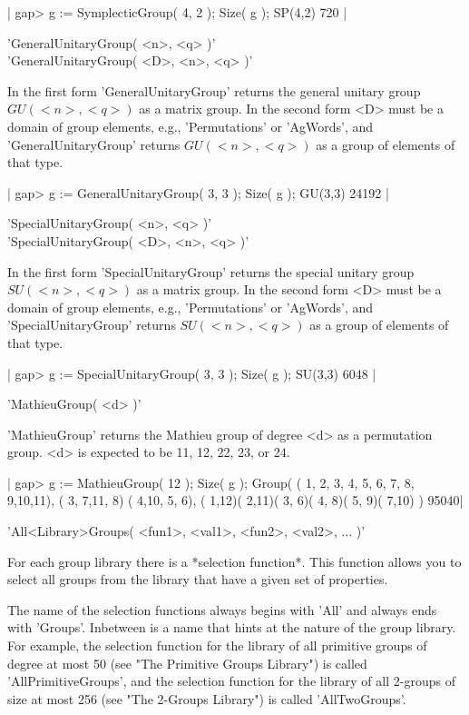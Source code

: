 |    gap> g := SymplecticGroup( 4, 2 ); Size( g );
    SP(4,2)
    720 |

\vspace{5mm}
'GeneralUnitaryGroup( <n>, <q> )'%
 \\
'GeneralUnitaryGroup( <D>, <n>, <q> )'

In the first form 'GeneralUnitaryGroup' returns the general unitary group
$GU(  <n>, <q> )$ as  a  matrix group.  In the second  form <D> must be a
domain  of  group  elements,   e.g.,  'Permutations'  or  'AgWords',  and
'GeneralUnitaryGroup' returns $GU( <n>, <q> )$ as  a group of elements of
that type.

|    gap> g := GeneralUnitaryGroup( 3, 3 ); Size( g );
    GU(3,3)
    24192 |

\vspace{5mm}
'SpecialUnitaryGroup( <n>, <q> )'%
 \\
'SpecialUnitaryGroup( <D>, <n>, <q> )'

In the first form 'SpecialUnitaryGroup' returns the special unitary group
$SU( <n>,  <q> )$ as a matrix  group.  In the second form  <D>  must be a
domain  of  group  elements,  e.g.,  'Permutations'  or  'AgWords',   and
'SpecialUnitaryGroup' returns $SU( <n>, <q> )$ as  a group of elements of
that type.

|    gap> g := SpecialUnitaryGroup( 3, 3 ); Size( g );
    SU(3,3)
    6048 |

\vspace{5mm}
'MathieuGroup( <d> )'%

'MathieuGroup' returns the Mathieu group of degree  <d>  as a permutation
group. <d> is expected to be 11, 12, 22, 23, or 24.

|    gap> g := MathieuGroup( 12 ); Size( g );
    Group( ( 1, 2, 3, 4, 5, 6, 7, 8, 9,10,11), ( 3, 7,11, 8)
    ( 4,10, 5, 6), ( 1,12)( 2,11)( 3, 6)( 4, 8)( 5, 9)( 7,10) )
    95040|


'All<Library>Groups( <fun1>, <val1>, <fun2>, <val2>, ... )'

For each  group library there  is a  *selection function*.  This function
allows you to select all groups from the library that have a given set of
properties.

The name of the selection functions always  begins with 'All' and  always
ends with 'Groups'.  Inbetween is a name  that hints at the nature of the
group library. For example, the selection function for the library of all
primitive groups  of  degree  at  most  50  (see  "The  Primitive  Groups
Library") is called 'AllPrimitiveGroups', and the  selection function for
the library of  all  2-groups of  size  at  most 256 (see  "The  2-Groups
Library") is called 'AllTwoGroups'.

